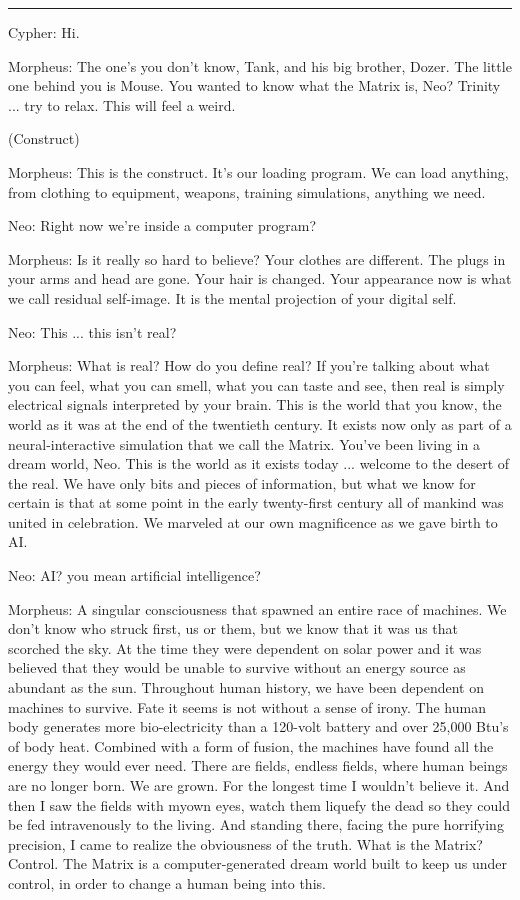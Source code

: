 \documentclass{ctexart}
\newcommand{\myparsep}{\noindent \rule[0.5ex]{\linewidth}{1pt}}
\newenvironment{myquote}{\color{green} \setlength{\leftskip}{6em} \setlength{\rightskip}{4em} \setlength{\parindent}{-2em}}{\par}
\begin{document}
\myparsep

\begin{myquote}
Cypher: Hi.

Morpheus: The one's you don't know, Tank, and his big brother, Dozer. The little one behind you is Mouse. You wanted to know what the Matrix is, Neo? Trinity ... try to relax. This will feel a weird.

(Construct)

Morpheus: This is the construct. It's our loading program. We can load anything, from clothing to equipment, weapons, training simulations, anything we need.

Neo: Right now we're inside a computer program?

Morpheus: Is it really so hard to believe? Your clothes are different. The plugs in your arms and head are gone. Your hair is changed. Your appearance now is what we call residual self-image. It is the mental projection of your digital self.

Neo: This ... this isn't real?

Morpheus: What is real? How do you define real? If you're talking about what you can feel, what you can smell, what you can taste and see, then real is simply electrical signals interpreted by your brain. This is the world that you know, the world as it was at the end of the twentieth century. It exists now only as part of a neural-interactive simulation that we call the Matrix. You've been living in a dream world, Neo. This is the world as it exists today ... welcome to the desert of the real. We have only bits and pieces of information, but what we know for certain is that at some point in the early twenty-first century all of mankind was united in celebration. We marveled at our own magnificence as we gave birth to AI.

Neo: AI? you mean artificial intelligence?

Morpheus: A singular consciousness that spawned an entire race of machines. We don't know who struck first, us or them, but we know that it was us that scorched the sky. At the time they were dependent on solar power and it was believed that they would be unable to survive without an energy source as abundant as the sun. Throughout human history, we have been dependent on machines to survive. Fate it seems is not without a sense of irony. The human body generates more bio-electricity than a 120-volt battery and over 25,000 Btu's of body heat. Combined with a form of fusion, the machines have found all the energy they would ever need. There are fields, endless fields, where human beings are no longer born. We are grown. For the longest time I wouldn't believe it. And then I saw the fields with myown eyes, watch them liquefy the dead so they could be fed intravenously to the living. And standing there, facing the pure horrifying precision, I came to realize the obviousness of the truth. What is the Matrix? Control. The Matrix is a computer-generated dream world built to keep us under control, in order to change a human being into this.


\end{myquote}
\end{document}
